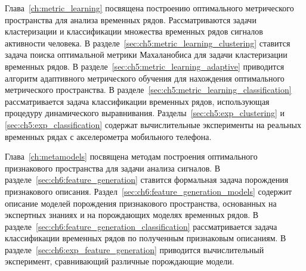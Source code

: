 Глава~\ref{ch:metric_learning} посвящена построению оптимального метрического пространства для анализа временных рядов.
Рассматриваются задачи кластеризации и классификации множества временных рядов сигналов активности человека.
В разделе~\ref{sec:ch5:metric_learning_clustering} ставится задача поиска оптимальной метрики Махаланобиса для задачи кластеризации временных рядов.
В разделе~\ref{sec:ch5:metric_learning_adaptive} приводится алгоритм адаптивного метрического обучения для нахождения оптимального метрического пространства.
В разделе~\ref{sec:ch5:metric_learning_classification} рассматривается задача классификации временных рядов, использующая процедуру динамического выравнивания. 
Разделы~\ref{sec:ch5:exp_clustering} и \ref{sec:ch5:exp_classification} содержат вычислительные эксперименты на реальных временных рядах с акселерометра мобильного телефона.

Глава~\ref{ch:metamodels} посвящена методам построения оптимального признакового пространства для задачи анализа сигналов. 
В разделе~\ref{sec:ch6:feature_generation} ставится формальная задача порождения признакового описания.
Раздел~\ref{sec:ch6:feature_generation_models} содержит описание моделей порождения признакового пространства, основанных на экспертных знаниях и на порождающих моделях временных рядов.
В разделе~\ref{sec:ch6:feature_generation_classification} рассматривается задача классификации временных рядов по полученным признаковым описаниям.
В разделе~\ref{sec:ch6:exp_feature_generation} приводится вычислительный эксперимент, сравнивающий различные порождающие модели.